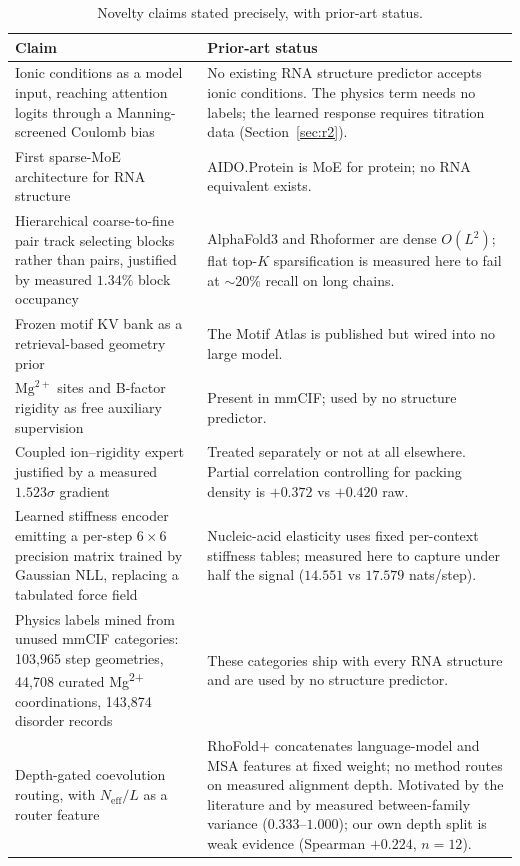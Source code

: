 \documentclass[11pt,a4paper]{article}
\begin{document}
\begin{table}[h]
\centering
\caption{Novelty claims stated precisely, with prior-art status.}
\begin{tabular}{p{6.6cm}p{8.2cm}}
\toprule
\textbf{Claim} & \textbf{Prior-art status} \\
\midrule
Ionic conditions as a model input, reaching attention logits through a
Manning-screened Coulomb bias & No existing RNA structure predictor accepts
ionic conditions. The physics term needs no labels; the learned response
requires titration data (Section~\ref{sec:r2}). \\
First sparse-MoE architecture for RNA structure & AIDO.Protein is MoE for
protein; no RNA equivalent exists. \\
Hierarchical coarse-to-fine pair track selecting blocks rather than pairs,
justified by measured $1.34\%$ block occupancy & AlphaFold3 and Rhoformer are
dense $O(L^2)$; flat top-$K$ sparsification is measured here to fail at
$\sim$20\% recall on long chains. \\
Frozen motif KV bank as a retrieval-based geometry prior & The Motif Atlas is
published but wired into no large model. \\
$\mathrm{Mg}^{2+}$ sites and B-factor rigidity as free auxiliary supervision &
Present in mmCIF; used by no structure predictor. \\
Coupled ion--rigidity expert justified by a measured $1.523\sigma$ gradient &
Treated separately or not at all elsewhere. Partial correlation controlling for
packing density is $+0.372$ vs $+0.420$ raw. \\
Learned stiffness encoder emitting a per-step $6\times6$ precision matrix
trained by Gaussian NLL, replacing a tabulated force field &
Nucleic-acid elasticity uses fixed per-context stiffness tables; measured here
to capture under half the signal ($14.551$ vs $17.579$ nats/step). \\
Physics labels mined from unused mmCIF categories: 103{,}965 step geometries,
44{,}708 curated Mg\textsuperscript{2+} coordinations, 143{,}874 disorder records &
These categories ship with every RNA structure and are used by no structure
predictor. \\
Depth-gated coevolution routing, with $N_{\text{eff}}/L$ as a router feature &
RhoFold+ concatenates language-model and MSA features at fixed weight; no method
routes on measured alignment depth. Motivated by the literature and by measured
between-family variance ($0.333$--$1.000$); our own depth split is weak evidence
(Spearman $+0.224$, $n=12$). \\
\bottomrule
\end{tabular}
\end{table}
\end{document}
